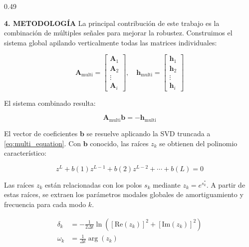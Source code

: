 \documentclass[final]{beamer}
\begin{document}
\begin{frame}[t]
\begin{columns}[t,totalwidth=\textwidth]
\begin{column}{0.49\textwidth}
\begin{block}{\textbf{4. METODOLOGÍA}}
La principal contribución de este trabajo es la combinación de múltiples señales 
para mejorar la robustez. Construimos el sistema global apilando verticalmente 
todas las matrices individuales:

\begin{equation}
\mathbf{A}_{\text{multi}} = 
\begin{bmatrix}
\mathbf{A}_1 \\
\mathbf{A}_2 \\
\vdots \\
\mathbf{A}_i
\end{bmatrix}, \quad
\mathbf{h}_{\text{multi}} = 
\begin{bmatrix}
\mathbf{h}_1 \\
\mathbf{h}_2 \\
\vdots \\
\mathbf{h}_i
\end{bmatrix}
\label{eq:multi_system}
\end{equation}

El sistema combinado resulta:

\begin{equation}
\mathbf{A}_{\text{multi}} \mathbf{b} = -\mathbf{h}_{\text{multi}}
\label{eq:multi_equation}
\end{equation}



El vector de coeficientes $\mathbf{b}$ se resuelve aplicando la SVD truncada a 
\eqref{eq:multi_equation}. Con $\mathbf{b}$ conocido, las raíces $z_k$ se obtienen
 del polinomio característico:


\begin{equation}
z^L + b(1)z^{L-1} + b(2)z^{L-2} + \cdots + b(L) = 0
\label{eq:characteristic_poly}
\end{equation}

Las raíces $z_k$ están relacionadas con los polos $s_k$ mediante 
$z_k = e^{s_k^*}$. A partir de estas raíces, se extraen los parámetros modales 
globales de amortiguamiento y frecuencia para cada modo $k$.


\begin{align}
\delta_k &= -\frac{1}{2\Delta t} \ln\left( [\text{Re}(z_k)]^2 + [\text{Im}(z_k)]^2 \right) \\
\omega_k &= \frac{1}{\Delta t} \arg(z_k)
\label{eq:frequency}
\end{align}


\end{block}
\end{column}
\end{columns}
\end{frame}
\end{document}
